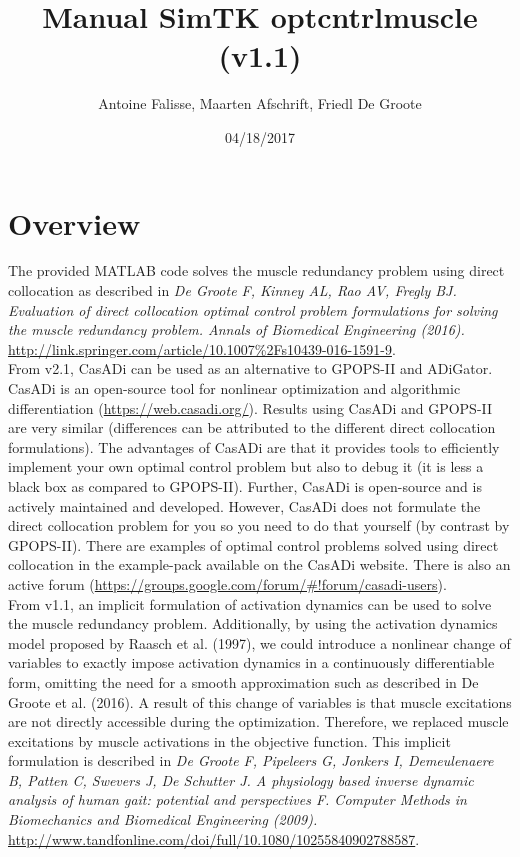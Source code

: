 \documentclass[a4paper,oneside,11pt]{article}
\begin{document}
\title{Manual SimTK optcntrlmuscle (v1.1)}
\author{Antoine Falisse, Maarten Afschrift, Friedl De Groote}
\date{04/18/2017} 
\maketitle
\tableofcontents

\section{Overview}

The provided MATLAB code solves the muscle redundancy problem using direct collocation  as described in \textit{De Groote F, Kinney AL, Rao AV, Fregly BJ. Evaluation of direct collocation optimal control problem formulations for solving the muscle redundancy problem. Annals of Biomedical Engineering (2016).} \url{http://link.springer.com/article/10.1007%2Fs10439-016-1591-9}. 
\\

From v2.1, CasADi can be used as an alternative to GPOPS-II and ADiGator. CasADi is an open-source tool for nonlinear optimization and algorithmic differentiation (\url{https://web.casadi.org/}). Results using CasADi and GPOPS-II are very similar (differences can be attributed to the different direct collocation formulations). The advantages of CasADi are that it provides tools to efficiently implement your own optimal control problem but also to debug it (it is less a black box as compared to GPOPS-II). Further, CasADi is open-source and is actively maintained and developed. However, CasADi does not formulate the direct collocation problem for you so you need to do that yourself (by contrast by GPOPS-II). There are examples of optimal control problems solved using direct collocation in the example-pack available on the CasADi website. There is also an active forum (\url{https://groups.google.com/forum/#!forum/casadi-users}). \\

From v1.1, an implicit formulation of activation dynamics can be used to solve the muscle redundancy problem. Additionally, by using the activation dynamics model proposed by Raasch et al. (1997), we could introduce a nonlinear change of variables to exactly impose activation dynamics in a continuously differentiable form, omitting the need for a smooth approximation such as described in De Groote et al. (2016). A result of this change of variables is that muscle excitations are not directly accessible during the optimization. Therefore, we replaced muscle excitations by muscle activations in the objective function. This implicit formulation is described in \textit{De Groote F, Pipeleers G, Jonkers I, Demeulenaere B, Patten C, Swevers J, De Schutter J. A physiology based inverse dynamic analysis of human gait: potential and perspectives F. Computer Methods in Biomechanics and Biomedical Engineering (2009).} \url{http://www.tandfonline.com/doi/full/10.1080/10255840902788587}.  \\
\end{document}
